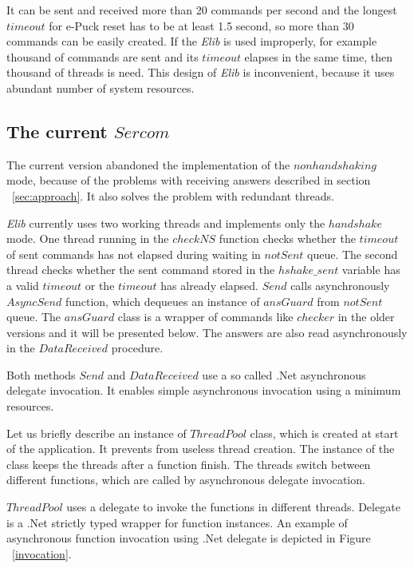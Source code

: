   It can be sent and received more than 20 commands per second and the longest $timeout$ for 
  e-Puck reset has to be at least 1.5 second, so more than 30 commands can be easily created.
  If the {\it Elib} is used improperly, for example thousand of commands are sent and its $timeout$ elapses
  in the same time, then thousand of threads is need. This design of {\it Elib} is inconvenient, because
  it uses abundant number of system resources.

\subsection*{The current $Sercom$}\label{sec:current}
  The current version abandoned the implementation of the $nonhandshaking$ mode, 
  because of the problems with receiving answers described 
  in section ~\ref{sec:approach}.
  It also solves the problem with	redundant threads. 
  
  {\it Elib} currently uses two working threads and implements only the $handshake$ mode.
  One thread running in the $checkNS$ function checks whether the $timeout$ of sent commands
  has not elapsed during waiting in $notSent$ queue. The second thread checks whether the sent command
  stored in the $hshake\_sent$ variable has a valid $timeout$ or the $timeout$ has already elapsed.
  $Send$ calls asynchronously $AsyncSend$ function, which dequeues an instance of $ansGuard$ from $notSent$ queue.
  The $ansGuard$ class is a wrapper of commands like $checker$ in the older versions and it will be presented below.
  The answers are also read asynchronously in the $DataReceived$ procedure.

  Both methods $Send$ and $DataReceived$ use a so called .Net asynchronous
  delegate invocation. It enables simple asynchronous invocation using a minimum resources.

  Let us briefly describe an instance of $ThreadPool$ class, which is created at 
  start of the application. It prevents from useless thread creation. The instance of the class keeps the threads after 
  a function finish. The threads switch between different functions, which are called 
  by asynchronous delegate invocation.
  
  $ThreadPool$ uses a delegate to invoke the functions in different threads.
  Delegate\cite{delegate} is a .Net strictly typed wrapper for function instances.
  An example of asynchronous function invocation using .Net delegate is depicted in Figure ~\ref{invocation}.
  
